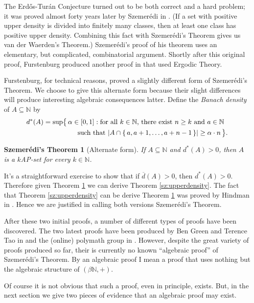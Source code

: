 \documentclass[12pt]{article}
\theoremstyle{plain}
\newtheorem{sz}[thm]{Szemer\'{e}di's Theorem}
\theoremstyle{definition}
\newcommand{\bbN}{\mathbb{N}}
\begin{document}
The Erd\H{o}s-Tur\'{a}n Conjecture turned out to be both correct and a
hard problem; it was proved almost forty years later by Szemer\'{e}di in
\cite{Szemeredi:1975uq}. 
(If a set with positive upper density is divided into finitely many
classes, then at least one class has positive upper density.
Combining this fact with Szemer\'{e}di's Theorem gives us van der
Waerden's Theorem.)
Szemer\'{e}di's proof of his theorem uses an elementary, but
complicated, combinatorial argument. 
Shortly after this original proof, Furstenburg produced another proof
in \cite{Furstenberg:1977fk} that used Ergodic Theory. 

Furstenburg, for technical reasons, proved a slightly different form
of Szemer\'{e}di's Theorem. 
We choose to give this alternate form because their slight differences
will produce interesting algebraic consequences latter.
Define the \textsl{Banach density} of $A \subseteq \bbN$ by
  \begin{align*}
    d^*(A) &= \sup\bigl\{\, \alpha \in [0,1] : \hbox{for all $k \in
      \bbN$, there exist $n \ge k$ and $a \in \bbN$} \\
    &\hspace{5em}\hbox{such that $|A \cap \{\,a, a+1, \ldots,
      a+n-1\,\}| \ge \alpha\cdot n$} \,\bigr\}.
  \end{align*}
  \begin{sz}[Alternate form]
    \label{sz:banach}
    If $A \subseteq \bbN$ and $d^*(A) > 0$, then $A$ is a $k$AP-set
    for every $k \in \bbN$.
  \end{sz}
It's a straightforward exercise to show that if $\overline{d}(A) > 0$,
then $d^*(A) > 0$.
Therefore given Theorem \ref{sz:banach} we can derive Theorem
\ref{sz:upperdensity}.
The fact that Theorem \ref{sz:upperdensity} can be derive Theorem
\ref{sz:banach} was proved by Hindman in \cite[Theorem
2.1]{Hindman:1982fk}.
Hence we are justified in calling both versions Szemer\'{e}di's
Theorem. 

After these two initial proofs, a number of different types of proofs
have been discovered. 
The two latest proofs have been produced by Ben Green and Terence Tao
in \cite{Green:2010uq} and the (online) polymath group in
\cite{Polymath:2010kx}. 
However, despite the great variety of proofs produced so far, their is
currently no known ``algebraic proof'' of Szemer\'{e}di's Theorem.
By an algebraic proof I mean a proof that uses nothing but the
algebraic structure of $(\beta\bbN, +)$. 

Of course it is not obvious that such a proof, even in principle,
exists.
But, in the next section we give two pieces of evidence that an
algebraic proof may exist. 
\end{document}

